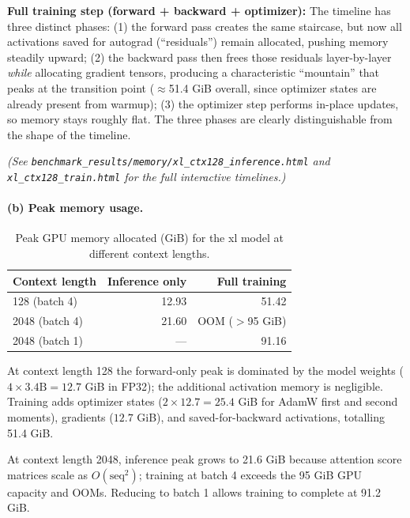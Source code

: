 \documentclass[11pt]{article}
\begin{document}
\textbf{Full training step (forward + backward + optimizer):}  The
timeline has three distinct phases:
(1) the forward pass creates the same staircase, but now all
activations saved for autograd (``residuals'') remain allocated,
pushing memory steadily upward;
(2) the backward pass then frees those residuals layer-by-layer
\emph{while} allocating gradient tensors, producing a characteristic
``mountain'' that peaks at the transition point ($\approx$51.4 GiB
overall, since optimizer states are already present from warmup);
(3) the optimizer step performs in-place updates, so memory stays
roughly flat.
The three phases are clearly distinguishable from the shape of the
timeline.

\emph{(See \texttt{benchmark\_results/memory/xl\_ctx128\_inference.html}
and \texttt{xl\_ctx128\_train.html} for the full interactive timelines.)}

\paragraph{(b) Peak memory usage.}

\begin{table}[h]
\centering
\caption{Peak GPU memory allocated (GiB) for the xl model at different context lengths.}\label{tab:peak-mem}
\begin{tabular}{l r r}
\toprule
Context length & Inference only & Full training \\
\midrule
128 (batch 4)  & 12.93 & 51.42 \\
2048 (batch 4) & 21.60 & OOM ($>$95 GiB) \\
2048 (batch 1) & ---   & 91.16 \\
\bottomrule
\end{tabular}
\end{table}

At context length 128 the forward-only peak is dominated by the
model weights ($4 \times 3.4\text{B} = 12.7$ GiB in FP32); the
additional activation memory is negligible.  Training adds optimizer
states ($2 \times 12.7 = 25.4$ GiB for AdamW first and second
moments), gradients ($12.7$ GiB), and saved-for-backward activations,
totalling 51.4 GiB.

At context length 2048, inference peak grows to 21.6 GiB because
attention score matrices scale as $O(\text{seq}^2)$; training at
batch 4 exceeds the 95 GiB GPU capacity and OOMs.  Reducing to
batch 1 allows training to complete at 91.2 GiB.
\end{document}
